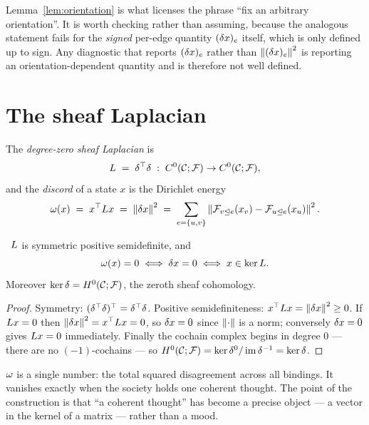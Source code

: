 \begin{remark}
Lemma~\ref{lem:orientation} is what licenses the phrase ``fix an
arbitrary orientation''. It is worth checking rather than assuming,
because the analogous statement fails for the \emph{signed} per-edge
quantity $(\delta x)_e$ itself, which is only defined up to sign. Any
diagnostic that reports $(\delta x)_e$ rather than $\left\lVert (\delta x)_e \right\rVert^2$
is reporting an orientation-dependent quantity and is therefore not
well defined.
\end{remark}

\section{The sheaf Laplacian}

\begin{definition}\label{def:laplacian}
The \emph{degree-zero sheaf Laplacian} is
\begin{equation}\label{eq:laplacian}
  L\;=\;\delta^\top\delta\;:\;C^{0}(\mathcal{C};\mathcal{F})\to C^{0}(\mathcal{C};\mathcal{F}),
\end{equation}
and the \emph{discord} of a state $x$ is the Dirichlet energy
\begin{equation}\label{eq:omega}
  \omega(x)\;=\;x^\top L x\;=\;\left\lVert \delta x \right\rVert^2
  \;=\;\sum_{e=\{u,v\}}
       \left\lVert \mathcal{F}_{v\trianglelefteq e}(x_v)-\mathcal{F}_{u\trianglelefteq e}(x_u) \right\rVert^2 .
\end{equation}
\end{definition}

\begin{proposition}\label{prop:Lpsd}
\Proved\ $L$ is symmetric positive semidefinite, and
\[
  \omega(x)=0
  \iff \delta x=0
  \iff x\in\ker L .
\]
Moreover $\ker\delta=H^{0}(\mathcal{C};\mathcal{F})$, the zeroth sheaf cohomology.
\end{proposition}
\begin{proof}
Symmetry: $(\delta^\top\delta)^\top=\delta^\top\delta$. Positive
semidefiniteness: $x^\top L x=\left\lVert \delta x \right\rVert^2\ge0$. If $L x=0$
then $\left\lVert \delta x \right\rVert^2=x^\top L x=0$, so $\delta x=0$ since
$\left\lVert \cdot \right\rVert$ is a norm; conversely $\delta x=0$ gives $L x=0$
immediately. Finally the cochain complex begins in degree $0$ --- there
are no $(-1)$-cochains --- so $H^{0}(\mathcal{C};\mathcal{F})=\ker\delta^0/\operatorname{im}\delta^{-1}=\ker\delta$.
\end{proof}

\begin{intu}\Intu
$\omega$ is a single number: the total squared disagreement across all
bindings. It vanishes exactly when the society holds one coherent
thought. The point of the construction is that ``a coherent thought'' has
become a precise object --- a vector in the kernel of a matrix --- rather
than a mood.
\end{intu}

